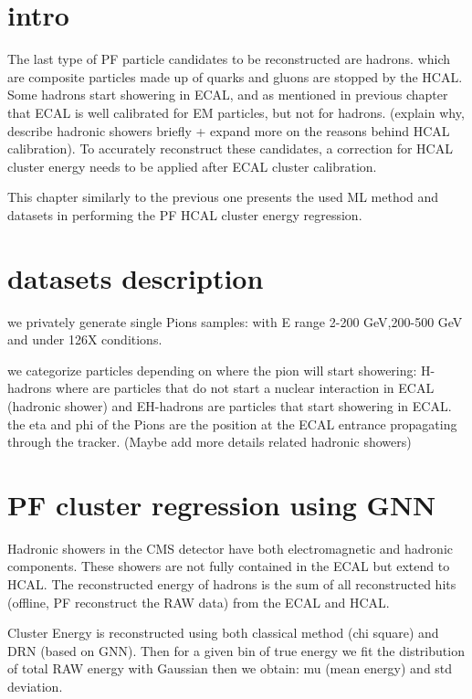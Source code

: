 \section{intro}

The last type of PF particle candidates to be reconstructed are hadrons. which are composite particles made up of quarks and gluons are stopped by the HCAL.
Some hadrons start showering in ECAL, and as mentioned in previous chapter that ECAL is well calibrated for EM particles, but not for hadrons.  (explain why, describe hadronic showers briefly + expand more on the reasons behind HCAL calibration). To accurately reconstruct these candidates, a correction for HCAL cluster energy needs to be applied after ECAL cluster calibration. 

This chapter similarly to the previous one presents the used ML method and datasets in performing the PF HCAL cluster energy regression.

\section{datasets description}

we privately generate single Pions samples: with E range 2-200 GeV,200-500 GeV and under 126X conditions.

we categorize particles depending on where the pion will start showering: H-hadrons where are particles that do not start a nuclear interaction in ECAL (hadronic shower) and EH-hadrons are particles that start showering in ECAL. the eta and phi of the Pions are the position at the ECAL entrance propagating through the tracker. (Maybe add more details related hadronic showers)

\section{PF cluster regression  using GNN}

Hadronic showers in the CMS detector have both electromagnetic and hadronic components. These showers are not fully contained in the ECAL but extend to HCAL. The reconstructed energy of hadrons is the sum of all reconstructed hits (offline, PF reconstruct the RAW data) from the ECAL and HCAL. 


Cluster Energy is reconstructed using both classical method (chi square) and DRN (based on GNN). 
Then for a given bin of true energy we fit the distribution of total RAW energy with Gaussian then we obtain: mu (mean energy) and std deviation.

